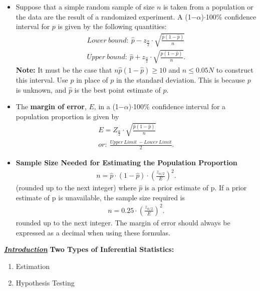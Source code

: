 \documentclass{report}
\begin{document}
        \pagebreak \bigbreak \noindent 
        \begin{itemize}
            \item Suppose that a simple random sample of size $n $ is taken from a population or the data are the result of a randomized experiment. A (1−$\alpha $)$\cdot  $100\% confidence interval for $p $ is given by the following quantities:
          \begin{align*}
              Lower\ bound:\ \hat{p} - z_{\frac{\alpha}{2}} \cdot \sqrt{\frac{\hat{p}(1 - \hat{p})}{n}}  \\
              Upper\ bound:\ \hat{p} + z_{\frac{\alpha}{2}} \cdot \sqrt{\frac{\hat{p}(1 - \hat{p})}{n}}
          .\end{align*}
          \textbf{Note:} It must be the case that $n\hat{p}(1-\hat{p})\geq 10$ and $n \leq 0.05N$ to construct this interval. Use $\hat{p}$ in place of $p$ in the standard deviation. This is because $p$ is unknown, and $\hat{p}$ is the best point estimate of $p$.
          \item The \textbf{margin of error}, $E $, in a (1−$\alpha $)$\cdot  $100\% confidence interval for a population proportion is given by
          \begin{align*}
              E = Z_{\frac{\alpha}{2}} \cdot \sqrt{\frac{\hat{p}(1-\hat{p})}{n}} \\
              or:\ \frac{Upper\ Limit\ - Lower\ Limit}{2}
          .\end{align*}
      \item \textbf{Sample Size Needed for Estimating the Population Proportion}
          \begin{align*}
              n = \hat{p} \cdot (1 - \hat{p}) \cdot \left(\frac{z_{\alpha/2}}{E}\right)^2 
          .\end{align*}
          (rounded up to the next integer) where $\hat{p}$ is a prior estimate of p.
          \bigbreak \noindent 
          If a prior estimate of p is unavailable, the sample size required is
          \begin{align*}
              n = 0.25 \cdot \left(\frac{z_{\alpha/2}}{E}\right)^2
          .\end{align*}
          rounded up to the next integer. The margin of error should always be expressed as a decimal when using these formulas.

      \end{itemize}


    \pagebreak \bigbreak \noindent 
    \textbf{\textit{\underline{Introduction}}}
    \bigbreak \noindent 
    \textbf{Two Types of Inferential Statistics:}
    \begin{enumerate}
        \item Estimation
        \item Hypothesis Testing
    \end{enumerate}
\end{document}
